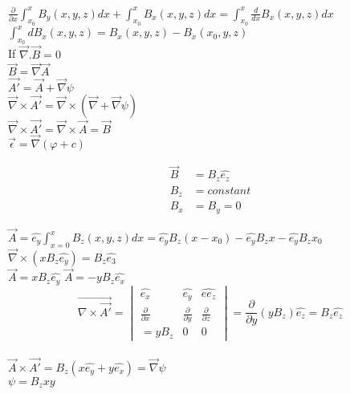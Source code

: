 \documentclass{article}
\begin{document}
$\frac{\partial}{\partial x}\int_{x_{0}}^{x}B_{y}(x,y,z)dx+\int_{x_{0}}^{x}B_{x}(x,y,z)dx=\int_{x_{0}}^{x}\frac{d}{dx}B_{x}(x,y,z)dx$\\

$\int_{x_{0}}^{x}dB_{x}(x,y,z)=B_{x}(x,y,z)-B_{x}(x_{0},y,z)$\\

If $\vec{\nabla}.\vec{B}=0$\\
$\vec{B}=\vec{\nabla}\vec{A}$\\
$\vec{A'}=\vec{A}+\vec{\nabla}\psi$\\
$\vec{\nabla}\times \vec{A'}=\vec{\nabla}\times
(\vec{\nabla}+\vec{\nabla}\psi)$\\
$\vec{\nabla}\times\vec{A'}=\vec{\nabla}\times\vec{A}=\vec{B}$\\
$\vec{\epsilon}=\vec{\nabla}(\varphi+c)$\\

\vspace{1cm}

\begin{align*} 
\vec{B} &=B_{z}\hat{e_{z}}\\
B_{z} &=constant\\
B_{x} &=B_{y}=0
\end{align*}

$\vec{A}=\hat{e_{y}}\int_{x=0}^{x}B_{z}(x,y,z)dx=\hat{e_{y}}B_{z}(x-x_{0})-\hat{e_{y}}B_{z}x-\hat{e_{y}}B_{z}x_{0}$\\

$\vec{\nabla}\times
(x B_{z}\hat{e_{y}})=B_{z}\hat{e_{3}}$\\

$\vec{A}=x B_{z}\hat{e_{y}}$ \hspace{1cm} $\vec{A}=-y B_{z}\hat{e_{x}}$\\

$$\vec{\nabla \times \vec{A'}}=\begin{vmatrix}
\hat{e_{x}} & \hat{e_{y}} & \hat{ee_{z}}\\
\frac{\partial}{\partial x} & \frac{\partial}{\partial y} & \frac{\partial}{\partial z}\\
=yB_{z} & 0 & 0
\end{vmatrix} = \frac{\partial}{\partial y}(yB_{z})\hat{e_{z}}=B_{z}\hat{e_{z}}$$\\

$\vec{A}\times
\vec{A'}=B_{z}(x\hat{e_{y}}+y\hat{e_{x}})=\vec{\nabla
}\psi$\\

$\psi=B_{z}xy$\\
\end{document}

